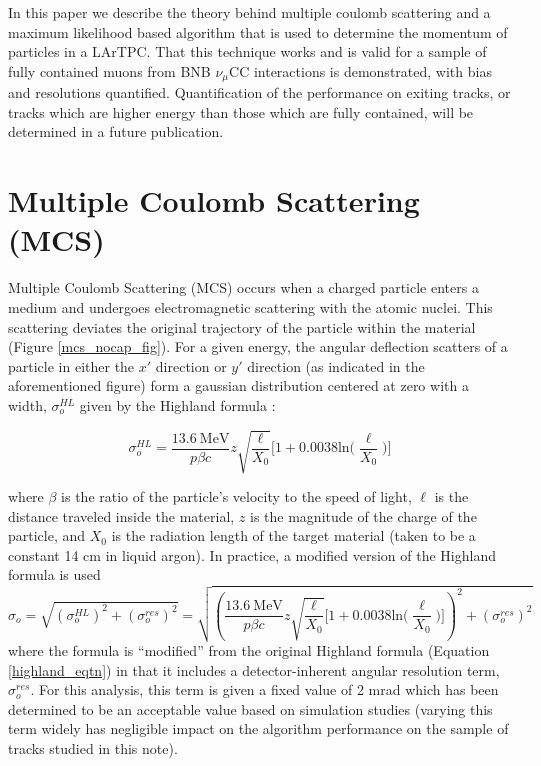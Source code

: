 \documentclass[a4paper,11pt]{article}
\begin{document}
In this paper we describe the theory behind multiple coulomb scattering and a maximum likelihood based algorithm that is used to determine the momentum of particles in a LArTPC. That this technique works and is valid for a sample of fully contained muons from BNB $\nu_\mu$CC interactions is demonstrated, with bias and resolutions quantified. Quantification of the performance on exiting tracks, or tracks which are higher energy than those which are fully contained, will be determined in a future publication.


\section{Multiple Coulomb Scattering (MCS)}

Multiple Coulomb Scattering (MCS) occurs when a charged particle enters a medium and undergoes electromagnetic scattering with the atomic nuclei. This scattering deviates the original trajectory of the particle within the material (Figure \ref{mcs_nocap_fig}). For a given energy, the angular deflection scatters of a particle in either the $x'$ direction or $y'$ direction (as indicated in the aforementioned figure) form a gaussian distribution centered at zero with a width, $\sigma_o^{HL}$ given by the Highland formula \cite{highland}: 

\begin{equation}\label{highland_eqtn}
	\sigma_o^{HL}=\frac{13.6\  \text{MeV}}{p\beta c}z\sqrt{\frac{\ell}{X_0}}\Big[1+0.0038\text{ln}\Big(\frac{\ell}{X_0}\Big)\Big]
\end{equation}

\noindent where $\beta$ is the ratio of the particle's velocity to the speed of light, $\ell$ is the distance traveled inside the material, $z$ is the magnitude of the charge of the particle, and $X_0$ is the radiation length of the target material (taken to be a constant 14 cm in liquid argon). In practice, a modified version of the Highland formula is used
\begin{equation}\label{modified_highland_eqtn}
\sigma_{o} = \sqrt{ (\sigma_o^{HL})^2 + (\sigma_o^{res})^2} = \sqrt{ (\frac{13.6\  \text{MeV}}{p\beta c}z\sqrt{\frac{\ell}{X_0}}\Big[1+0.0038\text{ln}\Big(\frac{\ell}{X_0}\Big)\Big])^2 + (\sigma_o^{res})^2 }
\end{equation}
where the formula is ``modified'' from the original Highland formula (Equation \ref{highland_eqtn}) in that it includes a detector-inherent angular resolution term, $\sigma_o^{res}$. For this analysis, this term is given a fixed value of 2 mrad which has been determined to be an acceptable value based on simulation studies (varying this term widely has negligible impact on the algorithm performance on the sample of tracks studied in this note).\\
\end{document}

